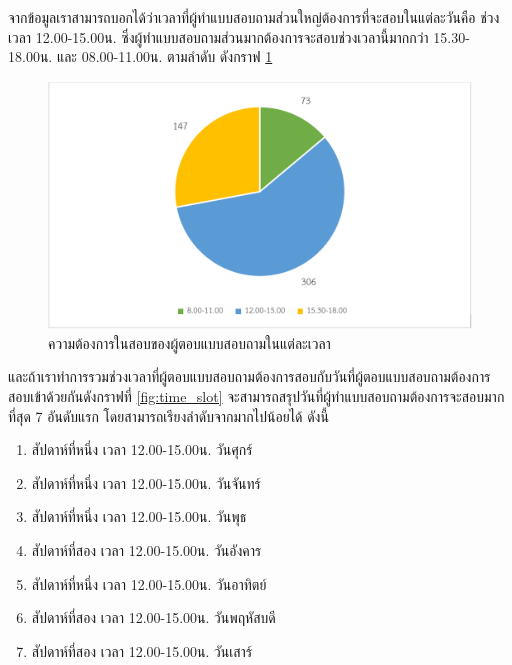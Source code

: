 \noindent จากข้อมูลเราสามารถบอกได้ว่าเวลาที่ผู้ทำแบบสอบถามส่วนใหญ่ต้องการที่จะสอบในแต่ละวันคือ
ช่วงเวลา 12.00-15.00น. ซึ่งผู้ทำแบบสอบถามส่วนมากต้องการจะสอบช่วงเวลานี้มากกว่า 15.30-18.00น. และ 08.00-11.00น. ตามลำดับ ดังกราฟ \ref{fig:time}
\begin{figure}
  \begin{center}
    \includegraphics[width=\linewidth]{images/pie_chart_for_final_exam_time.png}
  \end{center}
  \caption[Poem]{ความต้องการในสอบของผู้ตอบแบบสอบถามในแต่ละเวลา}
  \label{fig:time}     
\end{figure}
และถ้าเราทำการรวมช่วงเวลาที่ผู้ตอบแบบสอบถามต้องการสอบกับวันที่ผู้ตอบแบบสอบถามต้องการสอบเข้าด้วยกันดังกราฟที่ \ref{fig:time_slot} จะสามารถสรุปวันที่ผู้ทำแบบสอบถามต้องการจะสอบมากที่สุด 7 อันดับแรก โดยสามารถเรียงลำดับจากมากไปน้อยได้ ดังนี้
\begin{enumerate}
  \item สัปดาห์ที่หนึ่ง เวลา 12.00-15.00น. วันศุกร์ 
  \item สัปดาห์ที่หนึ่ง เวลา 12.00-15.00น. วันจันทร์
  \item สัปดาห์ที่หนึ่ง เวลา 12.00-15.00น. วันพุธ
  \item สัปดาห์ที่สอง เวลา 12.00-15.00น. วันอังคาร
  \item สัปดาห์ที่หนึ่ง เวลา 12.00-15.00น. วันอาทิตย์
  \item สัปดาห์ที่สอง เวลา 12.00-15.00น. วันพฤหัสบดี
  \item สัปดาห์ที่สอง เวลา 12.00-15.00น. วันเสาร์
\end{enumerate}

